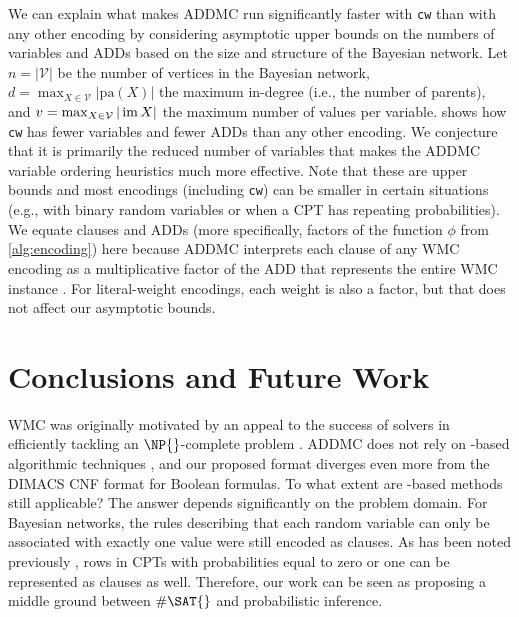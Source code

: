 We can explain what makes \textsf{ADDMC} \citep{DBLP:conf/aaai/DudekPV20} run
significantly faster with \texttt{cw} than with any other encoding by
considering asymptotic upper bounds on the numbers of variables and ADDs based
on the size and structure of the Bayesian network. Let $n = |\mathcal{V}|$ be
the number of vertices in the Bayesian network, $d = \max_{X \in \mathcal{V}}
|\mathrm{pa}(X)|$ the maximum in-degree (i.e., the number of parents), and $v =
\max_{X \in \mathcal{V}} |\operatorname{im} X|$ the maximum number of values per variable.
 shows how \texttt{cw} has fewer variables and fewer ADDs
than any other encoding. We conjecture that it is primarily the reduced number
of variables that makes the \textsf{ADDMC} variable ordering heuristics much
more effective. Note that these are upper bounds and most encodings (including
\texttt{cw}) can be smaller in certain situations (e.g., with binary random
variables or when a CPT has repeating probabilities). We equate clauses and ADDs
(more specifically, factors of the function $\phi$ from \cref{alg:encoding})
here because \textsf{ADDMC} interprets each clause of any WMC encoding as a
multiplicative factor of the ADD that represents the entire WMC instance
\citep{DBLP:conf/aaai/DudekPV20}. For literal-weight encodings, each weight is
also a factor, but that does not affect our asymptotic bounds.

\section{Conclusions and Future Work}

WMC was originally motivated by an appeal to the success of \SAT{} solvers in
efficiently tackling an $\NP{}$-complete problem
\citep{DBLP:conf/aaai/SangBK05}. \textsf{ADDMC} does not rely on \SAT{}-based
algorithmic techniques \citep{DBLP:conf/aaai/DudekPV20}, and our proposed format
diverges even more from the DIMACS CNF format for Boolean formulas. To what
extent are \SAT{}-based methods still applicable? The answer depends
significantly on the problem domain. For Bayesian networks, the rules describing
that each random variable can only be associated with exactly one value were
still encoded as clauses. As has been noted previously
\citep{DBLP:conf/sat/ChaviraD06}, rows in CPTs with probabilities equal to zero
or one can be represented as clauses as well. Therefore, our work can be seen as
proposing a middle ground between $\#\SAT{}$ and probabilistic inference.

